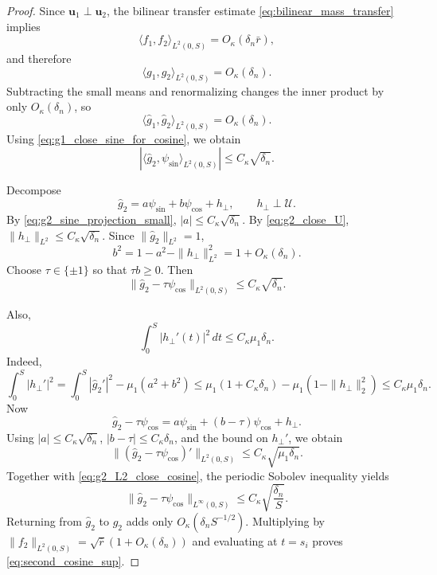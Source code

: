 \documentclass[10pt,a4paper]{amsart}
\begin{document}
\begin{proof}
	Since $\boldsymbol{u}_1\perp \boldsymbol{u}_2$, the bilinear transfer
	estimate \eqref{eq:bilinear_mass_transfer} implies
	\[
	\langle f_1,f_2\rangle_{L^2(0,S)}=O_\kappa(\delta_n\bar r),
	\]
	and therefore
	\[
	\langle g_1,g_2\rangle_{L^2(0,S)}=O_\kappa(\delta_n).
	\]
	Subtracting the small means and renormalizing changes the inner product by
	only $O_\kappa(\delta_n)$, so
	\[
	\langle \widehat g_1,\widehat g_2\rangle_{L^2(0,S)}
	=
	O_\kappa(\delta_n).
	\]
	Using \eqref{eq:g1_close_sine_for_cosine}, we obtain
	\begin{equation}\label{eq:g2_sine_projection_small}
		\left|
		\langle \widehat g_2,\psi_{\sin}\rangle_{L^2(0,S)}
		\right|
		\le
		C_\kappa\sqrt{\delta_n}.
	\end{equation}
	
	Decompose
	\[
	\widehat g_2=a\psi_{\sin}+b\psi_{\cos}+h_\perp,
	\qquad h_\perp\perp \mathcal U.
	\]
	By \eqref{eq:g2_sine_projection_small}, $|a|\le C_\kappa\sqrt{\delta_n}$.
	By \eqref{eq:g2_close_U}, $\|h_\perp\|_{L^2}\le C_\kappa\sqrt{\delta_n}$.
	Since $\|\widehat g_2\|_{L^2}=1$,
	\[
	b^2=1-a^2-\|h_\perp\|_{L^2}^2=1+O_\kappa(\delta_n).
	\]
	Choose $\tau\in\{\pm1\}$ so that $\tau b\ge 0$. Then
	\begin{equation}\label{eq:g2_L2_close_cosine}
		\|\widehat g_2-\tau\psi_{\cos}\|_{L^2(0,S)}
		\le C_\kappa\sqrt{\delta_n}.
	\end{equation}
	
	Also,
	\[
	\int_0^S|h_\perp'(t)|^2\,dt
	\le C_\kappa\mu_1\delta_n.
	\]
	Indeed,
	\[
	\int_0^S|h_\perp'|^2
	=
	\int_0^S|\widehat g_2'|^2-\mu_1(a^2+b^2)
	\le
	\mu_1(1+C_\kappa\delta_n)-\mu_1(1-\|h_\perp\|_2^2)
	\le
	C_\kappa\mu_1\delta_n.
	\]
	Now
	\[
	\widehat g_2-\tau\psi_{\cos}
	=
	a\psi_{\sin}+(b-\tau)\psi_{\cos}+h_\perp.
	\]
	Using $|a|\le C_\kappa\sqrt{\delta_n}$, $|b-\tau|\le C_\kappa\delta_n$,
	and the bound on $h_\perp'$, we obtain
	\[
	\|(\widehat g_2-\tau\psi_{\cos})'\|_{L^2(0,S)}
	\le
	C_\kappa\sqrt{\mu_1\delta_n}.
	\]
	Together with \eqref{eq:g2_L2_close_cosine}, the periodic Sobolev
	inequality yields
	\[
	\|\widehat g_2-\tau\psi_{\cos}\|_{L^\infty(0,S)}
	\le
	C_\kappa\sqrt{\frac{\delta_n}{S}}.
	\]
	Returning from $\widehat g_2$ to $g_2$ adds only
	$O_\kappa(\delta_n S^{-1/2})$. Multiplying by
	$\|f_2\|_{L^2(0,S)}=\sqrt{\bar r}(1+O_\kappa(\delta_n))$ and evaluating
	at $t=s_i$ proves \eqref{eq:second_cosine_sup}.
\end{proof}
\end{document}
